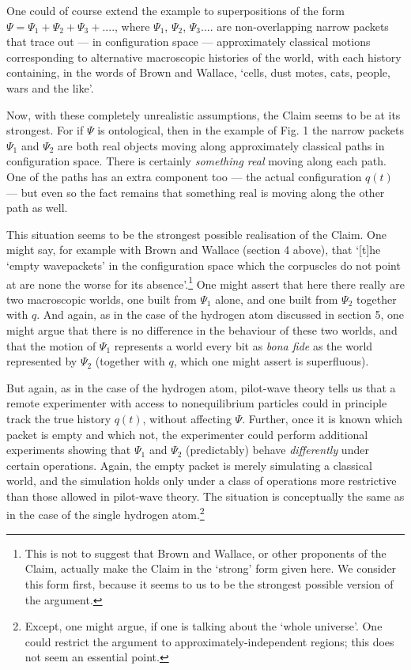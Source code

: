 \documentclass{article}%
\begin{document}
One could of course extend the example to superpositions of the form
$\Psi=\Psi_{1}+\Psi_{2}+\Psi_{3}+....$, where $\Psi_{1}$, $\Psi_{2}$,
$\Psi_{3}$.... are non-overlapping narrow packets that trace out --- in
configuration space --- approximately classical motions corresponding to
alternative macroscopic histories of the world, with each history containing,
in the words of Brown and Wallace, `cells, dust motes, cats, people, wars and
the like'.

Now, with these completely unrealistic assumptions, the Claim seems to be at
its strongest. For if $\Psi$ is ontological, then in the example of Fig. 1 the
narrow packets $\Psi_{1}$ and $\Psi_{2}$ are both real objects moving along
approximately classical paths in configuration space. There is certainly
\textit{something real} moving along each path. One of the paths has an extra
component too --- the actual configuration $q(t)$ --- but even so the fact
remains that something real is moving along the other path as well.

This situation seems to be the strongest possible realisation of the Claim.
One might say, for example with Brown and Wallace (section 4 above), that
`[t]he `empty wavepackets' in the configuration space which the corpuscles do
not point at are none the worse for its absence'.\footnote{This is not to
suggest that Brown and Wallace, or other proponents of the Claim, actually
make the Claim in the `strong' form given here. We consider this form first,
because it seems to us to be the strongest possible version of the argument.}
One might assert that here there really are two macroscopic worlds, one built
from $\Psi_{1}$ alone, and one built from $\Psi_{2}$ together with $q$. And
again, as in the case of the hydrogen atom discussed in section 5, one might
argue that there is no difference in the behaviour of these two worlds, and
that the motion of $\Psi_{1}$ represents a world every bit as \textit{bona
fide} as the world represented by $\Psi_{2}$ (together with $q$, which one
might assert is superfluous).

But again, as in the case of the hydrogen atom, pilot-wave theory tells us
that a remote experimenter with access to nonequilibrium particles could in
principle track the true history $q(t)$, without affecting $\Psi$. Further,
once it is known which packet is empty and which not, the experimenter could
perform additional experiments showing that $\Psi_{1}$ and $\Psi_{2}$
(predictably) behave \textit{differently} under certain operations. Again, the
empty packet is merely simulating a classical world, and the simulation holds
only under a class of operations more restrictive than those allowed in
pilot-wave theory. The situation is conceptually the same as in the case of
the single hydrogen atom.\footnote{Except, one might argue, if one is talking
about the `whole universe'. One could restrict the argument to
approximately-independent regions; this does not seem an essential point.}
\end{document}
